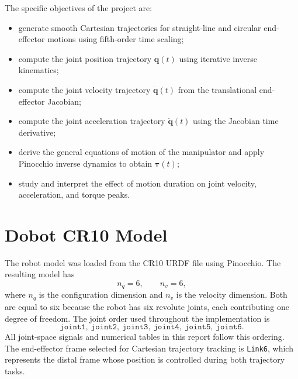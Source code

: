 \documentclass[12pt,a4paper]{article}
\begin{document}
The specific objectives of the project are:
\begin{itemize}
    \item generate smooth Cartesian trajectories for straight-line and circular end-effector
          motions using fifth-order time scaling;
    \item compute the joint position trajectory $\bm{q}(t)$ using iterative inverse kinematics;
    \item compute the joint velocity trajectory $\dot{\bm{q}}(t)$ from the translational
          end-effector Jacobian;
    \item compute the joint acceleration trajectory $\ddot{\bm{q}}(t)$ using the Jacobian time
          derivative;
    \item derive the general equations of motion of the manipulator and apply Pinocchio inverse
          dynamics to obtain $\bm{\tau}(t)$;
    \item study and interpret the effect of motion duration on joint velocity, acceleration, and
          torque peaks.
\end{itemize}

\section{Dobot CR10 Model}

The robot model was loaded from the CR10 URDF file using Pinocchio. The resulting model has
\begin{equation}
    n_q = 6, \qquad n_v = 6,
\end{equation}
where $n_q$ is the configuration dimension and $n_v$ is the velocity dimension. Both are equal
to six because the robot has six revolute joints, each contributing one degree of freedom. The
joint order used throughout the implementation is
\begin{equation}
    \texttt{joint1},\ \texttt{joint2},\ \texttt{joint3},\
    \texttt{joint4},\ \texttt{joint5},\ \texttt{joint6}.
\end{equation}
All joint-space signals and numerical tables in this report follow this ordering. The
end-effector frame selected for Cartesian trajectory tracking is \texttt{Link6}, which
represents the distal frame whose position is controlled during both trajectory tasks.
\end{document}
